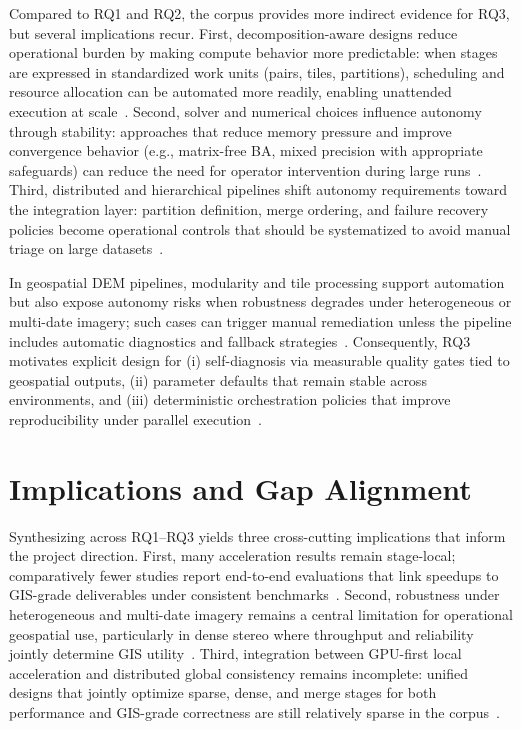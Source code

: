Compared to RQ1 and RQ2, the corpus provides more indirect evidence for RQ3, but several implications recur. First, decomposition-aware designs reduce operational burden by making compute behavior more predictable: when stages are expressed in standardized work units (pairs, tiles, partitions), scheduling and resource allocation can be automated more readily, enabling unattended execution at scale~\cite{Li2025FastMap,Zhong2025InstantSfM,deFranchis2014}. Second, solver and numerical choices influence autonomy through stability: approaches that reduce memory pressure and improve convergence behavior (e.g., matrix-free BA, mixed precision with appropriate safeguards) can reduce the need for operator intervention during large runs~\cite{Safari2025,Gopinath2025}. Third, distributed and hierarchical pipelines shift autonomy requirements toward the integration layer: partition definition, merge ordering, and failure recovery policies become operational controls that should be systematized to avoid manual triage on large datasets~\cite{Zheng2023,Li2025BALM,Zhou2026}.

In geospatial DEM pipelines, modularity and tile processing support automation but also expose autonomy risks when robustness degrades under heterogeneous or multi-date imagery; such cases can trigger manual remediation unless the pipeline includes automatic diagnostics and fallback strategies~\cite{Amadei2025,Masquil2026}. Consequently, RQ3 motivates explicit design for (i) self-diagnosis via measurable quality gates tied to geospatial outputs, (ii) parameter defaults that remain stable across environments, and (iii) deterministic orchestration policies that improve reproducibility under parallel execution~\cite{Elias2025}.

\section{Implications and Gap Alignment}

Synthesizing across RQ1--RQ3 yields three cross-cutting implications that inform the project direction. First, many acceleration results remain stage-local; comparatively fewer studies report end-to-end evaluations that link speedups to GIS-grade deliverables under consistent benchmarks~\cite{Elias2025}. Second, robustness under heterogeneous and multi-date imagery remains a central limitation for operational geospatial use, particularly in dense stereo where throughput and reliability jointly determine GIS utility~\cite{Masquil2026}. Third, integration between GPU-first local acceleration and distributed global consistency remains incomplete: unified designs that jointly optimize sparse, dense, and merge stages for both performance and GIS-grade correctness are still relatively sparse in the corpus~\cite{Li2025FastMap,Zhong2025InstantSfM,Zheng2023}.

